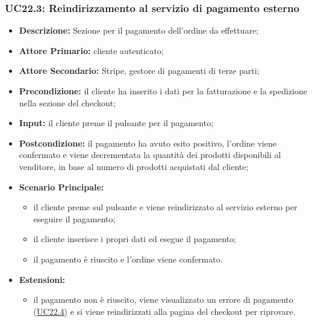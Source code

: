             \subsubsection{UC22.3: Reindirizzamento al servizio di pagamento esterno}
            \label{sec:UC22.3}
                \begin{itemize}
                    \item \textbf{Descrizione:} Sezione per il pagamento dell'ordine da effettuare;
                    \item \textbf{Attore Primario:} cliente autenticato;
                    \item \textbf{Attore Secondario:} Stripe, gestore di pagamenti di terze parti;
                    \item \textbf{Precondizione:} il cliente ha inserito i dati per la fatturazione e la spedizione nella sezione del checkout;
                    \item \textbf{Input:} il cliente preme il pulsante per il pagamento;
                    \item \textbf{Postcondizione:} il pagamento ha avuto esito positivo, l'ordine viene confermato e viene decrementata la quantità dei prodotti disponibili al venditore, in base al numero di prodotti acquistati dal cliente;
                    \item \textbf{Scenario Principale:}
                    \begin{itemize}
                        \item il cliente preme sul pulsante e viene reindirizzato al servizio esterno per eseguire il pagamento;
                        \item il cliente inserisce i propri dati ed esegue il pagamento;
                        \item il pagamento è riuscito e l'ordine viene confermato.
                    \end{itemize}
                    \item \textbf{Estensioni:}
                    \begin{itemize}
                        \item il pagamento non è riuscito, viene visualizzato un errore di pagamento (\hyperref[sec:UC22.4]{\underline{UC22.4}}) e si viene reindirizzati alla pagina del checkout per riprovare.
                    \end{itemize}
                \end{itemize}
